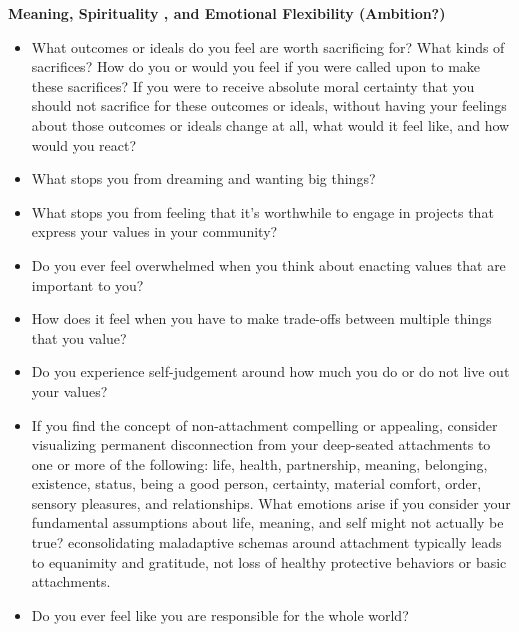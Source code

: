 \documentclass[12pt,letterpaper]{article}
\begin{document}
\noindent \textbf{Meaning, Spirituality , and Emotional Flexibility (Ambition?)}
\begin{itemize}
    \item What outcomes or ideals do you feel are worth sacrificing for? What kinds of sacrifices? How do you or would you feel if you were called upon to make these sacrifices? If you were to receive absolute moral certainty that you should not sacrifice for these outcomes or ideals, without having your feelings about those outcomes or ideals change at all, what would it feel like, and how would you react?
    \item What stops you from dreaming and wanting big things?
    \item What stops you from feeling that it's worthwhile to engage in projects that express your values in your community?
    \item Do you ever feel overwhelmed when you think about enacting values that are important to you?
    \item How does it feel when you have to make trade-offs between multiple things that you value?
    \item Do you experience self-judgement around how much you do or do not live out your values?
    \item If you find the concept of non-attachment compelling or appealing, consider visualizing permanent disconnection from your deep-seated attachments to one or more of the following: life, health, partnership, meaning, belonging, existence, status, being a good person, certainty, material comfort, order, sensory pleasures, and relationships. What emotions arise if you consider your fundamental assumptions about life, meaning, and self might not actually be true? econsolidating maladaptive schemas around attachment typically leads to equanimity and gratitude, not loss of healthy protective behaviors or basic attachments.
    \item Do you ever feel like you are responsible for the whole world?
\end{itemize}
\end{document}
